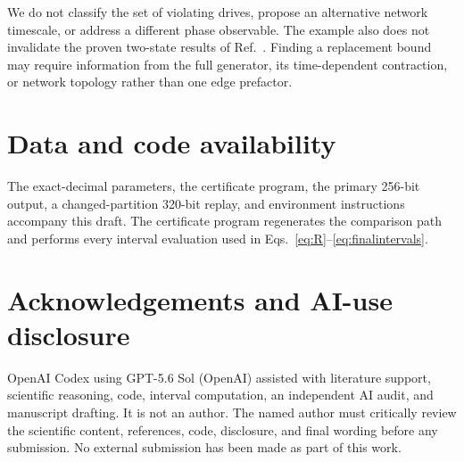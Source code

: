 \documentclass[11pt]{article}
\begin{document}
We do not classify the set of violating drives, propose an alternative network
timescale, or address a different phase observable.  The example also does not
invalidate the proven two-state results of Ref.~\cite{deguenther2022phase}.  Finding a
replacement bound may require information from the full generator, its time-dependent
contraction, or network topology rather than one edge prefactor.

\section*{Data and code availability}

The exact-decimal parameters, the certificate program, the primary 256-bit output, a
changed-partition 320-bit replay, and environment instructions accompany this draft.
The certificate program regenerates the comparison path and performs every interval
evaluation used in Eqs.~\eqref{eq:R}--\eqref{eq:finalintervals}.

\section*{Acknowledgements and AI-use disclosure}

OpenAI Codex using GPT-5.6 Sol (OpenAI) assisted with literature support, scientific
reasoning, code, interval computation, an independent AI audit, and manuscript
drafting.  It is not an author.  The named author must critically review the scientific
content, references, code, disclosure, and final wording before any submission.  No
external submission has been made as part of this work.



\end{document}
